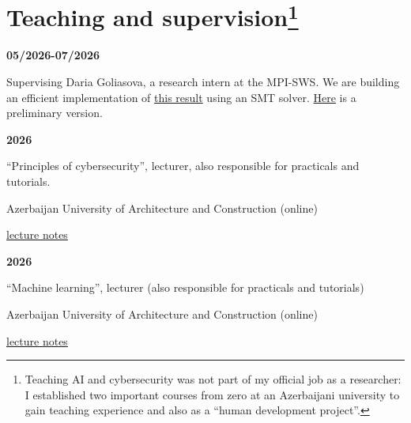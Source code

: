 \documentclass{article}
\begin{document}
	
	\vspace*{0.2cm}
	\section*{Teaching and supervision\footnote{Teaching AI and cybersecurity was not part of my official job as a researcher: I established two important courses from zero at an Azerbaijani university to gain teaching experience and also as a ``human development project''.}}

	
	\noindent\begin{minipage}{0.3\textwidth}
		\hspace{0.5cm} \textbf{05/2026-07/2026}
	\end{minipage}
	\begin{minipage}{0.7\textwidth}
		Supervising Daria Goliasova, a research intern at the MPI-SWS.
		We are building an efficient implementation of \href{https://people.mpi-sws.org/~joel/publications/2dim-constraint-loop24.pdf}{this result} using an SMT solver.
		\href{https://178.105.42.180/}{Here} is a preliminary version.	
		\end{minipage}
	\vspace{0.3cm}
	
	\noindent\begin{minipage}{0.3\textwidth}
		\hspace{0.5cm} \textbf{
			2026}
	\end{minipage}
	\begin{minipage}{0.7\textwidth}
		``Principles of cybersecurity'', lecturer, also responsible for practicals and tutorials.
		
		Azerbaijan University of Architecture and Construction (online)
		
		\href{http://toghrul-karimov.github.io/assets/lecture-notes/cybersecurity.pdf}{lecture notes}
	\end{minipage}
	\vspace{0.3cm}
	
	\noindent\begin{minipage}{0.3\textwidth}
		\hspace{0.5cm} \textbf{
			2026}
	\end{minipage}
	\begin{minipage}{0.7\textwidth}
		``Machine learning'', lecturer (also responsible for practicals and tutorials)
		
		Azerbaijan University of Architecture and Construction (online)
		
		\href{http://toghrul-karimov.github.io/assets/lecture-notes/ml.pdf}{lecture notes}
	\end{minipage}
	\vspace{0.3cm}
	
\end{document}

